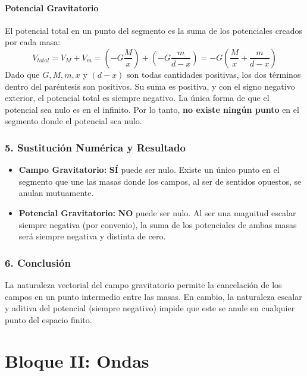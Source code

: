 \paragraph*{Potencial Gravitatorio}
El potencial total en un punto del segmento es la suma de los potenciales creados por cada masa:
$$ V_{total} = V_M + V_m = \left(-G \frac{M}{x}\right) + \left(-G \frac{m}{d-x}\right) = -G \left(\frac{M}{x} + \frac{m}{d-x}\right) $$
Dado que $G, M, m, x$ y $(d-x)$ son todas cantidades positivas, los dos términos dentro del paréntesis son positivos. Su suma es positiva, y con el signo negativo exterior, el potencial total es siempre negativo.
La única forma de que el potencial sea nulo es en el infinito. Por lo tanto, \textbf{no existe ningún punto} en el segmento donde el potencial sea nulo.

\subsubsection*{5. Sustitución Numérica y Resultado}
\begin{cajaresultado}
\begin{itemize}
    \item \textbf{Campo Gravitatorio:} \textbf{SÍ} puede ser nulo. Existe un único punto en el segmento que une las masas donde los campos, al ser de sentidos opuestos, se anulan mutuamente.
    \item \textbf{Potencial Gravitatorio:} \textbf{NO} puede ser nulo. Al ser una magnitud escalar siempre negativa (por convenio), la suma de los potenciales de ambas masas será siempre negativa y distinta de cero.
\end{itemize}
\end{cajaresultado}

\subsubsection*{6. Conclusión}
\begin{cajaconclusion}
La naturaleza vectorial del campo gravitatorio permite la cancelación de los campos en un punto intermedio entre las masas. En cambio, la naturaleza escalar y aditiva del potencial (siempre negativo) impide que este se anule en cualquier punto del espacio finito.
\end{cajaconclusion}

\newpage

\section{Bloque II: Ondas}
\label{sec:ondas_2009_sep_ext}

